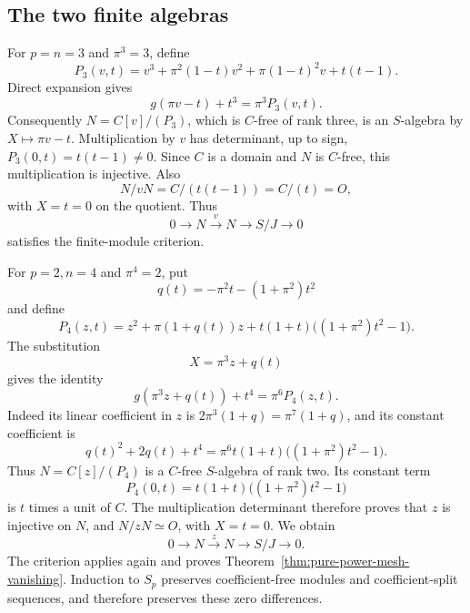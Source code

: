 \subsection{The two finite algebras}

For \(p=n=3\) and \(\pi^3=3\), define
\begin{equation}\label{eq:pure-power-cubic-polynomial}
 P_3(v,t)=v^3+\pi^2(1-t)v^2+\pi(1-t)^2v+t(t-1).
\end{equation}
Direct expansion gives
\begin{equation}\label{eq:pure-power-cubic-identity}
 g(\pi v-t)+t^3=\pi^3P_3(v,t).
\end{equation}
Consequently \(N=C[v]/(P_3)\), which is \(C\)-free of rank three,
is an \(S\)-algebra by \(X\mapsto\pi v-t\).
Multiplication by \(v\) has determinant, up to sign,
\(P_3(0,t)=t(t-1)\ne0\).  Since \(C\) is a domain and \(N\)
is \(C\)-free, this multiplication is injective.  Also
\[
 N/vN=C/(t(t-1))=C/(t)=O,
\]
with \(X=t=0\) on the quotient.  Thus
\begin{equation}\label{eq:pure-power-cubic-normalization}
 0\longrightarrow N\xrightarrow{v}N
       \longrightarrow S/J\longrightarrow0
\end{equation}
satisfies the finite-module criterion.

For \(p=2,n=4\) and \(\pi^4=2\), put
\[
 q(t)=-\pi^2t-(1+\pi^2)t^2
\]
and define
\begin{equation}\label{eq:pure-power-quartic-polynomial}
 P_4(z,t)=z^2+\pi(1+q(t))z
       +t(1+t)\bigl((1+\pi^2)t^2-1\bigr).
\end{equation}
The substitution
\begin{equation}\label{eq:pure-power-quartic-coordinate}
 X=\pi^3z+q(t)
\end{equation}
gives the identity
\begin{equation}\label{eq:pure-power-quartic-identity}
 g(\pi^3z+q(t))+t^4=\pi^6P_4(z,t).
\end{equation}
Indeed its linear coefficient in \(z\) is
\(2\pi^3(1+q)=\pi^7(1+q)\), and its constant coefficient is
\[
 q(t)^2+2q(t)+t^4
       =\pi^6t(1+t)\bigl((1+\pi^2)t^2-1\bigr).
\]
Thus \(N=C[z]/(P_4)\) is a \(C\)-free \(S\)-algebra of rank two.
Its constant term
\begin{equation}\label{eq:pure-power-quartic-constant}
 P_4(0,t)=t(1+t)\bigl((1+\pi^2)t^2-1\bigr)
\end{equation}
is \(t\) times a unit of \(C\).  The multiplication determinant
therefore proves that \(z\) is injective on \(N\), and
\(N/zN\simeq O\), with \(X=t=0\).  We obtain
\begin{equation}\label{eq:pure-power-quartic-normalization}
 0\longrightarrow N\xrightarrow{z}N
       \longrightarrow S/J\longrightarrow0.
\end{equation}
The criterion applies again and proves
Theorem~\ref{thm:pure-power-mesh-vanishing}.  Induction to \(S_p\)
preserves coefficient-free modules and coefficient-split sequences,
and therefore preserves these zero differences.

